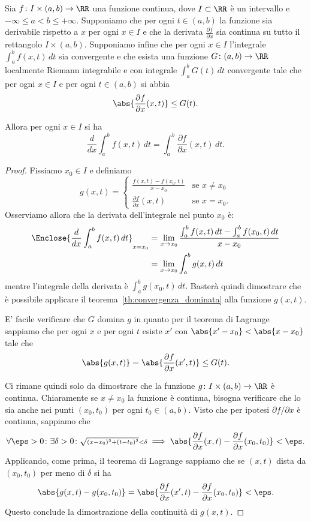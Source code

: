 \begin{theorem}%
  \mymark{**}%
  \label{th:derivata_integrale}%
%
Sia $f\colon I\times(a,b)\to \RR$ una funzione continua, 
dove $I\subset \RR$ è un intervallo e $-\infty \le a < b \le +\infty$.
Supponiamo che per ogni $t\in (a,b)$ la funzione sia derivabile rispetto a $x$
per ogni $x\in I$
e che la derivata $\frac{\partial f}{\partial x}$ sia continua su tutto il rettangolo 
$I\times(a,b)$.
Supponiamo infine che per ogni $x\in I$ l'integrale
$\int_a^b f(x,t)\, dt$ sia convergente e che
esista una funzione $G\colon(a,b)\to \RR$ localmente Riemann integrabile 
e con integrale $\int_a^b G(t)\, dt$ convergente tale che per ogni $x\in I$ 
e per ogni $t\in (a,b)$ si abbia 
\[
  \abs{\frac{\partial f}{\partial x}(x,t)} \le G(t).
\]

Allora per ogni $x\in I$ si ha
\[
  \frac{d}{dx} \int_a^b f(x,t)\, dt = \int_a^b \frac{\partial f}{\partial x}(x,t)\, dt.  
\]
\end{theorem}
%
\begin{proof}
Fissiamo $x_0\in I$ e definiamo 
\[
 g(x,t) = \begin{cases}
 \frac{f(x,t) - f(x_0,t)}{x-x_0} &\text{se $x\neq x_0$}\\
 \frac{\partial f}{\partial x}(x,t) & \text{se $x = x_0$}.
\end{cases}  
\]
Osserviamo allora che la derivata dell'integrale nel punto $x_0$ 
è:
\begin{align*}
    \Enclose{\frac{d}{dx} \int_a^b f(x,t)\, dt}_{x=x_0}
  &= \lim_{x\to x_0} \frac{\int_a^b f(x,t)\, dt - \int_a^b f(x_0,t)\, dt }{x-x_0}\\
  &= \lim_{x\to x_0} \int_a^b g(x,t)\, dt  
\end{align*}
mentre l'integrale della derivata è 
$\int_a^b g(x_0,t)\, dt.$
Basterà quindi dimostrare che è possibile applicare il teorema~\ref{th:convergenza_dominata}
alla funzione $g(x,t)$.

E' facile verificare che $G$ domina $g$ in quanto per il teorema di Lagrange sappiamo 
che per ogni $x$ e per ogni $t$ esiste $x'$ con $\abs{x'-x_0}<\abs{x-x_0}$ tale che 
\[
  \abs{g(x,t)} = \abs{\frac{\partial f}{\partial x}(x',t)} \le G(t).
\]

Ci rimane quindi solo da dimostrare che la funzione $g\colon I\times (a,b)\to \RR$ 
è continua. 
Chiaramente se $x\neq x_0$ la funzione è continua, bisogna verificare che lo 
sia anche nei punti $(x_0,t_0)$ per ogni $t_0\in (a,b)$. 
Visto che per ipotesi $\partial f / \partial x$ è continua, sappiamo 
che 
\[
  \forall \eps>0 \colon \exists \delta>0\colon 
  {\scriptstyle\sqrt{(x-x_0)^2+(t-t_0)^2}<\delta} 
  \implies \abs{\frac{\partial f}{\partial x}(x,t) - \frac{\partial f}{\partial x}(x_0,t_0)}<\eps.
\]
Applicando, come prima, il teorema di Lagrange sappiamo che se $(x,t)$ dista da $(x_0,t_0)$
per meno di $\delta$ si ha 
\[
\abs{g(x,t) - g(x_0,t_0)} 
= \abs{\frac{\partial f}{\partial x}(x',t) - \frac{\partial f}{\partial x}(x_0,t_0)}
 < \eps.
\]
Questo conclude la dimostrazione della continuità di $g(x,t)$.
\end{proof}

